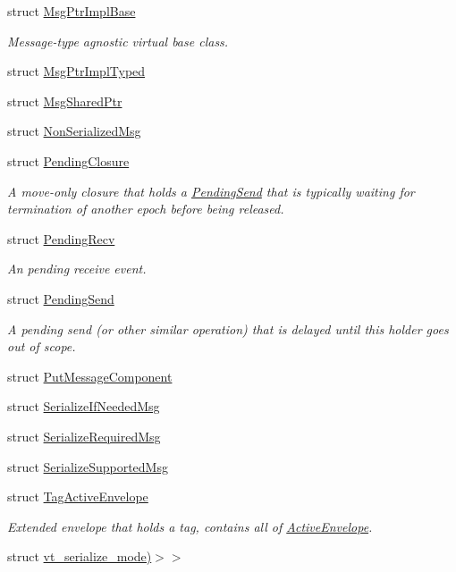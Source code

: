 \begin{DoxyCompactItemize}
struct \hyperlink{structvt_1_1messaging_1_1_msg_ptr_impl_base}{Msg\+Ptr\+Impl\+Base}
\begin{DoxyCompactList}\small\item\em Message-\/type agnostic virtual base class. \end{DoxyCompactList}\item 
struct \hyperlink{structvt_1_1messaging_1_1_msg_ptr_impl_typed}{Msg\+Ptr\+Impl\+Typed}
\item 
struct \hyperlink{structvt_1_1messaging_1_1_msg_shared_ptr}{Msg\+Shared\+Ptr}
\item 
struct \hyperlink{structvt_1_1messaging_1_1_non_serialized_msg}{Non\+Serialized\+Msg}
\item 
struct \hyperlink{structvt_1_1messaging_1_1_pending_closure}{Pending\+Closure}
\begin{DoxyCompactList}\small\item\em A move-\/only closure that holds a {\ttfamily \hyperlink{structvt_1_1messaging_1_1_pending_send}{Pending\+Send}} that is typically waiting for termination of another epoch before being released. \end{DoxyCompactList}\item 
struct \hyperlink{structvt_1_1messaging_1_1_pending_recv}{Pending\+Recv}
\begin{DoxyCompactList}\small\item\em An pending receive event. \end{DoxyCompactList}\item 
struct \hyperlink{structvt_1_1messaging_1_1_pending_send}{Pending\+Send}
\begin{DoxyCompactList}\small\item\em A pending send (or other similar operation) that is delayed until this holder goes out of scope. \end{DoxyCompactList}\item 
struct \hyperlink{structvt_1_1messaging_1_1_put_message_component}{Put\+Message\+Component}
\item 
struct \hyperlink{structvt_1_1messaging_1_1_serialize_if_needed_msg}{Serialize\+If\+Needed\+Msg}
\item 
struct \hyperlink{structvt_1_1messaging_1_1_serialize_required_msg}{Serialize\+Required\+Msg}
\item 
struct \hyperlink{structvt_1_1messaging_1_1_serialize_supported_msg}{Serialize\+Supported\+Msg}
\item 
struct \hyperlink{structvt_1_1messaging_1_1_tag_active_envelope}{Tag\+Active\+Envelope}
\begin{DoxyCompactList}\small\item\em Extended envelope that holds a tag, contains all of {\ttfamily \hyperlink{structvt_1_1messaging_1_1_active_envelope}{Active\+Envelope}}. \end{DoxyCompactList}\item 
struct \hyperlink{structvt_1_1messaging_1_1msg__serialization__mode_3_01_message_t_00_01cxx14__void__t_3_01decltyp859af933e7cec0c00885df897a55208a}{vt\+\_\+serialize\+\_\+mode)$>$$>$}
\end{DoxyCompactItemize}
